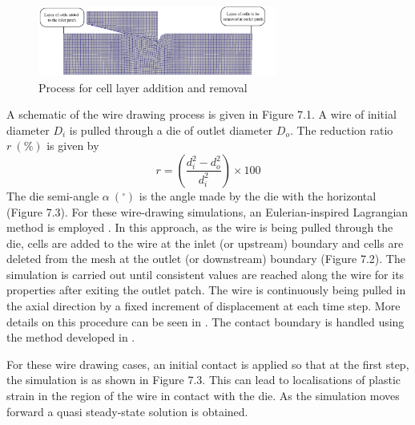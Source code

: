 \documentclass[sn-mathphys,Numbered,draft]{sn-jnl}%
\begin{document}
\begin{figure}[htb]
\begin{center}
	\includegraphics[width=0.7\textwidth]{./Figures/SimulationAndAnalysis/wireMesh_InletOutlet.jpg}
\caption{Process for cell layer addition and removal}
\label{fig:wireInletOutlet}
\end{center}
\end{figure}



A schematic of the wire drawing process is given in Figure 7.1. A wire of initial diameter $D_i$ is pulled through a die of outlet diameter $D_o$. The reduction ratio $r\ (\%)$ is given by
\begin{equation}
    r=\left(\frac{d_i^2-d_o^2}{d_i^2}\right)\times100
\end{equation}
The die semi-angle $\alpha\ (^{\circ})$ is the angle made by the die with the horizontal (Figure 7.3).
For these wire-drawing simulations, an Eulerian-inspired Lagrangian method is employed \cite{cardiff_eulerian-inspired_2017}. In this approach, as the wire is being pulled through the die, cells are added to the wire at the inlet (or upstream) boundary and cells are deleted from the mesh at the outlet (or downstream) boundary (Figure 7.2). The simulation is
carried out until consistent values are reached along the wire for its properties after exiting the outlet patch. The wire is continuously being pulled in the axial direction by a fixed increment of displacement at each time step. More details on this procedure can be seen in \citet{cardiff_eulerian-inspired_2017}. The contact boundary is handled using the method developed in \citet{cardiff_development_2012,cardiff_lagrangian_2017}.

For these wire drawing cases, an initial contact is applied so that at the first step, the simulation is as shown in Figure 7.3. This can lead to localisations of plastic strain in the region of the wire in contact with the die. As the simulation moves forward a quasi steady-state solution is obtained. 
\end{document}
